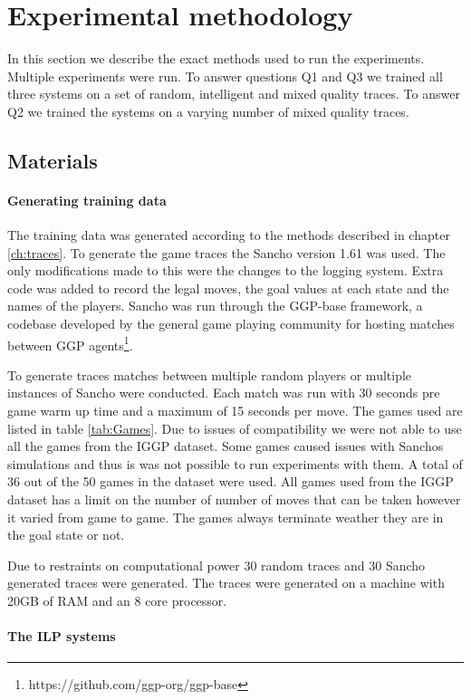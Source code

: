 \chapter{Experimental methodology}\label{ch:methodology}

In this section we describe the exact methods used to run the experiments. Multiple experiments were run. To answer questions Q1 and Q3 we trained all three systems on a set of random, intelligent and mixed quality traces. To answer Q2 we trained the systems on a varying number of mixed quality traces.
\section{Materials}
\subsubsection{Generating training data}
The training data was generated according to the methods described in chapter \ref{ch:traces}. To generate the game traces the Sancho version 1.61 was used\cite{Sancho/Github}. The only modifications made to this were the changes to the logging system. Extra code was added to record the legal moves, the goal values at each state and the names of the players. Sancho was run through the GGP-base framework, a codebase developed by the general game playing community for hosting matches between GGP agents\footnote{https://github.com/ggp-org/ggp-base}.

To generate traces matches between multiple random players or multiple instances of Sancho were conducted. Each match was run with 30 seconds pre game warm up time and a maximum of 15 seconds per move. The games used are listed in table \ref{tab:Games}. Due to issues of compatibility we were not able to use all the games from the IGGP dataset. Some games caused issues with Sanchos simulations and thus is was not possible to run experiments with them. A total of 36 out of the 50 games in the dataset were used. All games used from the IGGP dataset has a limit on the number of number of moves that can be taken however it varied from game to game. The games always terminate weather they are in the goal state or not.

Due to restraints on computational power 30 random traces and 30 Sancho generated traces were generated. The traces were generated on a machine with 20GB of RAM and an 8 core processor. 

\subsubsection{The ILP systems}

